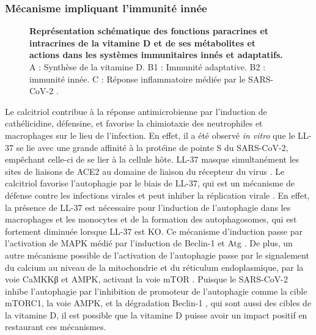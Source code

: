 \documentclass[
  a4paper,
  DIV=11,
  numbers=noendperiod,
  listof=totoc]{scrreprt}
\begin{document}
\subsubsection{Mécanisme impliquant l'immunité
innée}\label{muxe9canisme-impliquant-limmunituxe9-innuxe9e}

\begin{figure}


\caption[Représentation schématique des fonctions paracrines et
intracrines de la vitamine D et de ses métabolites et actions dans les
systèmes immunitaires innés et
adaptatifs.]{\label{fig-vd-covid-function}\textbf{Représentation
schématique des fonctions paracrines et intracrines de la vitamine D et
de ses métabolites et actions dans les systèmes immunitaires innés et
adaptatifs.} A : Synthèse de la vitamine D. B1 : Immunité adaptative. B2
: immunité innée. C : Réponse inflammatoire médiée par le
\ac{SARS-CoV-2} \autocite{Contreras-Bolívar.2023}.}

\end{figure}%

Le calcitriol contribue à la réponse antimicrobienne par l'induction de
cathélicidine, défensine, et favorise la chimiotaxie des neutrophiles et
macrophages sur le lieu de l'infection. En effet, il a été observé
\emph{in vitro} que le LL-37 se lie avec une grande affinité à la
protéine de pointe S du \ac{SARS-CoV-2}, empêchant celle-ci de se lier à
la cellule hôte. LL-37 masque simultanément les sites de liaisons de
\ac{ACE2} au domaine de liaison du récepteur du virus
\autocite{Wang.2021.ACS.manual}. Le calcitriol favorise l'autophagie par
le biais de LL-37, qui est un mécanisme de défense contre les infections
virales et peut inhiber la réplication virale \autocite{Gotelli.2022}.
En effet, la présence de LL-37 est nécessaire pour l'induction de
l'autophagie dans les macrophages et les monocytes et de la formation
des autophagosomes, qui est fortement diminuée lorsque LL-37 est KO. Ce
mécanisme d'induction passe par l'activation de \ac{MAPK} médié par
l'induction de Beclin-1 et Atg \autocite{Yuk.2009}. De plus, un autre
mécanisme possible de l'activation de l'autophagie passe par le
signalement du calcium au niveau de la mitochondrie et du réticulum
endoplasmique, par la voie \ac{CaMKKβ} et \ac{AMPK}, activant la voie
mTOR \autocite{Yuk.2009,Shiravi.2022}. Puisque le SARS-CoV-2 inhibe
l'autophagie par l'inhibition de promoteur de l'autophagie comme la
cible \ac{mTORC1}, la voie \ac{AMPK}, et la dégradation Beclin-1
\autocite{Gotelli.2022}, qui sont aussi des cibles de la vitamine D, il
est possible que la vitamine D puisse avoir un impact positif en
restaurant ces mécanismes.
\end{document}
